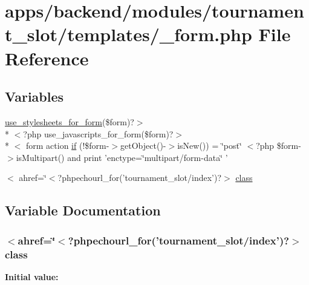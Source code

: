 \hypertarget{backend_2modules_2tournament__slot_2templates_2__form_8php}{\section{apps/backend/modules/tournament\-\_\-slot/templates/\-\_\-form.php File Reference}
\label{backend_2modules_2tournament__slot_2templates_2__form_8php}
}
\subsection*{Variables}
\begin{DoxyCompactItemize}
\item 
\hyperlink{live_2modules_2user_2templates_2__form_8php_a86bc4522fdbe625b07bc4a4d6eec3df7}{use\-\_\-stylesheets\-\_\-for\-\_\-form}(\$form)?$>$\\*
$<$?php use\-\_\-javascripts\-\_\-for\-\_\-form(\$form)?$>$\\*
$<$ form action \hyperlink{backend_2modules_2tournament__slot_2templates_2__form_8php_ae30a307b320d8da5d9a945eaf68f7549}{if} (!\$form-\/$>$get\-Object()-\/$>$is\-New()) = \char`\"{}post\char`\"{} $<$?php \$form-\/$>$is\-Multipart() and print 'enctype=\char`\"{}multipart/form-\/data\char`\"{} '
\item 
$<$ ahref=\char`\"{}$<$?phpechourl\-\_\-for('tournament\-\_\-slot/index')?$>$ \hyperlink{backend_2modules_2tournament__slot_2templates_2__form_8php_a88914c8c739334be6d0f56462868e494}{class}
\end{DoxyCompactItemize}


\subsection{Variable Documentation}
\hypertarget{backend_2modules_2tournament__slot_2templates_2__form_8php_a88914c8c739334be6d0f56462868e494}{
\subsubsection[{class}]{\setlength{\rightskip}{0pt plus 5cm}$<$ahref=\char`\"{}$<$?phpechourl\-\_\-for('tournament\-\_\-slot/index')?$>$ class}}\label{backend_2modules_2tournament__slot_2templates_2__form_8php_a88914c8c739334be6d0f56462868e494}
{\bfseries Initial value\-:}


